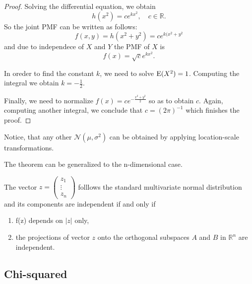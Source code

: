 \begin{proof}
Solving the differential equation, we obtain
\[
h(x^2) = c e^{kx^2}, \quad c \in \mathbb{R}.
\]
So the joint PMF can be written as follows:
\[
f(x,y) = h(x^2 + y^2) = c e^{k(x^2+y^2}
\]
and due to independece of $X$ and $Y$ the PMF of $X$ is
\[
f(x) = \sqrt{c} e^{kx^2}.
\]


In oreder to find the constant $k$, we need to solve $\operatorname{E}(X^2) = 1$.
Computing the integral we obtain $k=-\frac{1}{2}$.

Finally, we need to normalize $f(x) = c e^{-\frac{x^2 + y^2}{2}}$ so as to
obtain $c$. Again, computing another integral,
we conclude that $c=(2\pi)^{-1}$ which finishes the proof.
\end{proof}

Notice, that any other $\mathcal{N}(\mu, \sigma^2)$ can be obtained by applying
location-scale transformations.

The theorem can be generalized to the n-dimensional case.
\begin{theorem}\label{th:mvn}
The vector $z = \begin{pmatrix} z_1 \\ \vdots \\ z_n \end{pmatrix}$
folllows the standard multivariate normal distribution and its components
are independent if and only if
\begin{enumerate}
  \item f(z) depends on $\vert z \vert$ only,
  \item the projections of vector $z$ onto the orthogonal subspaces $A$ and $B$
  in $\mathbb{R}^n$ are independent.
\end{enumerate}
\end{theorem}


\subsection{Chi-squared}

